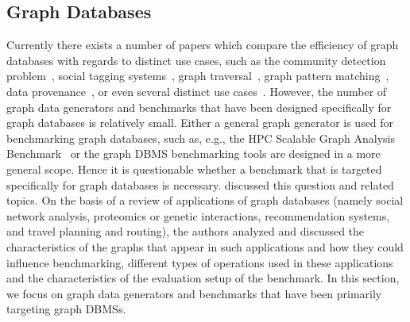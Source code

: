 \subsection{Graph Databases}
\label{sec:generators_GraphDatabases}

Currently there exists a number  of papers which compare the efficiency of graph databases with regards to distinct use cases, such as  the community detection problem~\cite{Beis2015}, social tagging systems~\cite{Giatsoglou2011}, graph traversal~\cite{Ciglan:2012:BTO:2374486.2375242}, graph pattern matching~\cite{Pobiedina2014}, data provenance~\cite{Vicknair:2010:CGD:1900008.1900067}, or even several distinct use cases~\cite{Grossniklaus2013Towar-24253}. However, the number of graph data generators and benchmarks that have been designed specifically for graph databases is relatively small. Either a general graph generator is used for benchmarking graph databases, such as, e.g., the HPC Scalable Graph Analysis Benchmark~\cite{Dominguez-Sal:2010:SGD:1927585.1927590} or the graph DBMS benchmarking tools are designed in a more general scope. Hence it is questionable whether a benchmark  that is targeted specifically for graph databases is necessary. \cite{Dominguez-Sal:2010:DDG:1946050.1946053} discussed this question and related topics. On the basis of a review of applications of graph databases (namely social network analysis, proteomics or genetic interactions, recommendation systems, and travel planning and routing), the authors analyzed and discussed the characteristics of the graphs that appear in such applications and how they could influence benchmarking, different types of operations used in these applications and the characteristics of the evaluation setup of the benchmark. In this section, we focus on graph data generators and benchmarks that have been primarily targeting graph DBMSs.


